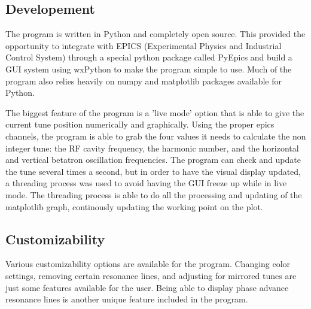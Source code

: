 \documentclass[%
 reprint,%
 amssymb, amsmath,%
 aip,cha,%
]{revtex4-1}
\begin{document}
\subsection{Developement}
The program is written in Python and completely open source. This provided the opportunity to integrate with EPICS (Experimental Physics and Industrial Control System) through a special python package called PyEpics and build a GUI system using wxPython to make the program simple to use. Much of the program also relies heavily on numpy and matplotlib packages available for Python.

The biggest feature of the program is a 'live mode' option that is able to give the current tune position numerically and graphically. Using the proper epics channels, the program is able to grab the four values it needs to calculate the non integer tune: the RF cavity frequency, the harmonic number, and the horizontal and vertical betatron oscillation frequencies. The program can check and update the tune several times a second, but in order to have the visual display updated, a threading process was used to avoid having the GUI freeze up while in live mode. The threading process is able to do all the processing and updating of the matplotlib graph, continously updating the working point on the plot.

\subsection{Customizability}
Various customizability options are available for the program. Changing color settings, removing certain resonance lines, and adjusting for mirrored tunes are just some features available for the user. Being able to display phase advance resonance lines is another unique feature included in the program.
\end{document}
